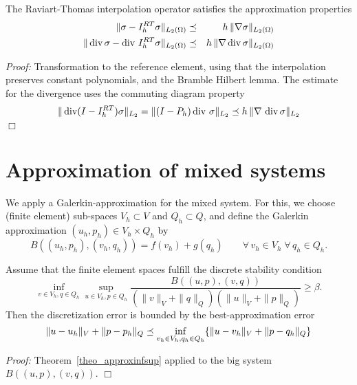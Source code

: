 \bigskip

\begin{theorem} The Raviart-Thomas interpolation operator satisfies
the approximation properties
\begin{eqnarray*}
\| \sigma - I_h^{RT} \sigma \|_{L_2(\Omega)} & \preceq &
         h \, \| \nabla \sigma \|_{L_2(\Omega)} \\
\| \operatorname{div} \sigma - \operatorname{div} \, I_h^{RT} \sigma \|_{L_2(\Omega)} & \preceq &
         h \, \| \nabla \operatorname{div} \sigma \|_{L_2(\Omega)} \\
\end{eqnarray*}
\end{theorem}
{\em Proof:} Transformation to the reference element, using that the 
interpolation preserves constant polynomials, and the Bramble Hilbert lemma.
The estimate for the divergence uses the commuting diagram property
$$
\| \operatorname{div} (I - I_h^{RT}) \sigma \|_{L_2} = \| (I-P_h) \operatorname{div} \, \sigma \|_{L_2}
\preceq h \, \| \nabla \, \operatorname{div} \sigma \|_{L_2}
$$
\hfill $\Box$
\section{Approximation of mixed systems}
We apply a Galerkin-approximation for the mixed system. For this,
we choose (finite element) sub-spaces $V_h \subset V$ and $Q_h \subset Q$, 
and define the Galerkin approximation $(u_h, p_h) \in V_h \times Q_h$ by
$$
B( (u_h, p_h), (v_h, q_h) ) = f(v_h) + g(q_h) \qquad \forall \, v_h \in V_h 
\; \forall \, q_h \in Q_h.
$$
\begin{theorem}
Assume that the finite element spaces fulfill the discrete stability
condition
\begin{equation}\label{equ_discreteinfsup}
\inf_{v \in V_h, q \in Q_h } \sup_{u \in V_h, p \in Q_h} \frac{B((u,p),(v,q))}{ ( \|v\|_V+\|q\|_Q) (\|u\|_V+\|p\|_Q)} \geq \beta.
\end{equation}
Then the discretization error is bounded by the best-approximation error
$$
\| u - u_h \|_V + \| p - p_h \|_Q \preceq \inf_{v_h \in V_h, q_h \in Q_h}
        \{ \| u - v_h \|_V + \| p - q_h \|_Q \}
$$
\end{theorem}
{\em Proof:} Theorem~\ref{theo_approxinfsup} applied to the big system $B((u,p),(v,q))$. \hfill $\Box$

\bigskip

